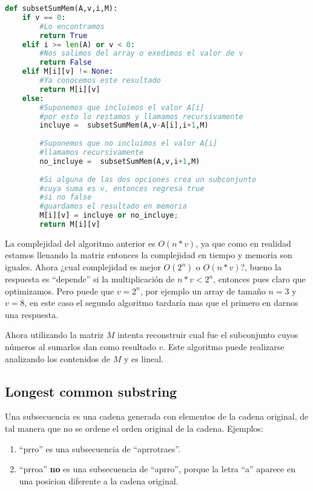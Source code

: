 \begin{lstlisting}[language=Python, caption=Subset sum programacion dinamica]
def subsetSumMem(A,v,i,M):
    if v == 0:
        #Lo encontramos
        return True
    elif i >= len(A) or v < 0:
        #Nos salimos del array o exedimos el valor de v
        return False
    elif M[i][v] != None:
        #Ya conocemos este resultado
        return M[i][v]
    else:
        #Suponemos que incluimos el valor A[i]
        #por esto lo restamos y llamamos recursivamente
        incluye =  subsetSumMem(A,v-A[i],i+1,M)
        
        #Suponemos que no incluimos el valor A[i]
        #llamamos recursivamente
        no_incluye =  subsetSumMem(A,v,i+1,M)
        
        #Si alguna de las dos opciones crea un subconjunto
        #cuya suma es v, entonces regresa true
        #si no false
        #guardamos el resultado en memoria
        M[i][v] = incluye or no_incluye;
        return M[i][v] 
\end{lstlisting}
 
 La complejidad del algoritmo anterior es $O(n*v)$, ya que como en realidad estamos llenando la matriz entonces la complejidad en tiempo y memoria son iguales. Ahora ¿cual complejidad es mejor $O(2^n)$ o $O(n*v)$?, bueno la respuesta es ``depende'' si la multiplicación de $n*v < 2^n$, entonces pues claro que optimizamos. Pero puede que $v=2^n$, por ejemplo un array de tamaño $n=3$ y $v=8$, en este caso el segundo algoritmo tardaría mas que el primero en darnos una respuesta. 
 
 Ahora utilizando la matriz $M$ intenta reconstruir cual fue el subconjunto cuyos números al sumarlos dan como resultado $v$. Este algoritmo puede realizarse analizando los contenidos de $M$ y es lineal.
 
 \subsection{Longest common substring}
 
 Una subsecuencia es una cadena generada con elementos de la cadena original, de tal manera que no se ordene el orden original de la cadena. Ejemplos:
 
 \begin{enumerate}
     \item ``prro'' es una subsecuencia de ``aprrotraes''.
     \item ``prroa'' \textbf{no} es una subsecuencia de ``aprro'', porque la letra ``a'' aparece en una posicion diferente a la cadena original.
 \end{enumerate}
 
